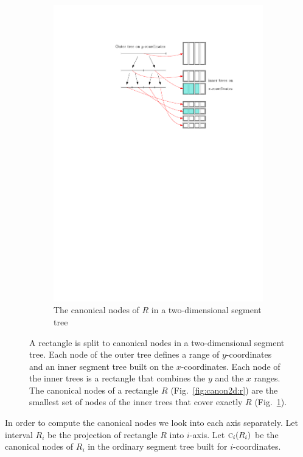 \documentclass[english,gradu]{tktltiki2018}
\begin{document}
\begin{figure}
\begin{subfigure}[t]{0.75\textwidth}
		\includegraphics[width=\textwidth,page=1]{fig/segtree2d}
		\caption{The canonical nodes of $R$ in a two-dimensional segment tree}\label{fig:canon2d:tree}
	\end{subfigure}
	\caption{A rectangle is split to canonical nodes in a two-dimensional segment tree.
	Each node of the outer tree defines a range of $y$-coordinates and an inner segment tree built on the $x$-coordinates.
	Each node of the inner trees is a rectangle that combines the $y$ and the $x$ ranges.
	The canonical nodes of a rectangle $R$ (Fig.~\ref{fig:canon2d:r}) are the smallest set of nodes of the inner trees that cover exactly $R$ (Fig.~\ref{fig:canon2d:tree}).}\label{fig:canon2d}
\end{figure}

In order to compute the canonical nodes we look into each axis separately.
Let interval $R_i$ be the projection of rectangle $R$ into $i$-axis.
Let $\canoni{R_i}{i}$ be the canonical nodes of $R_i$ in the ordinary segment tree built for $i$-coordinates.
\end{document}
